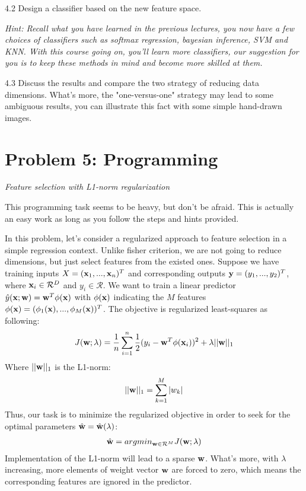 \documentclass{article}
\theoremstyle{definition}
\theoremstyle{definition}
\theoremstyle{remark}
\begin{document}
4.2 Design a classifier based on the new feature space.

\emph{Hint: Recall what you have learned in the previous lectures, you now have a few choices of classifiers such as softmax regression, bayesian inference, SVM and KNN. With this course going on, you'll learn more classifiers, our suggestion for you is to keep these methods in mind and become more skilled at them.}


4.3 Discuss the results and compare the two strategy of reducing data dimensions. What's more, the "one-versus-one" strategy may lead to some ambiguous results, you can illustrate this fact with some simple hand-drawn images.


\section*{Problem 5: Programming}
\emph{Feature selection with L1-norm regularization}

This programming task seems to be heavy, but don't be afraid. This is actually an easy work as long as you follow the steps and hints provided.

In this problem, let's consider a regularized approach to feature selection in a simple regression context. Unlike fisher criterion, we are not going to reduce dimensions, but just select features from the existed ones. Suppose we have training inputs $X=(\bold{x}_{1},...,\bold{x}_{n})^{T}$ and corresponding outputs $\bold{y}=(y_{1},...,y_{2})^{T}$, where $\bold{x}_{i}\in \mathcal{R}^{D}$ and $y_{i}\in \mathcal{R}$. We want to train a linear predictor $\hat{y}(\bold{x};\bold{w})=\bold{w}^{T}\phi(\bold{x})$ with $\phi(\bold{x})$ indicating the $M$ features $\phi(\bold{x})=(\phi_{1}(\bold{x}),...,\phi_{M}(\bold{x}))^{T}$. The objective is regularized least-squares as following:
\begin{eqnarray}
J(\bold{w};\lambda)=\frac{1}{n}\sum_{i=1}^{n}\frac{1}{2}(y_{i}-\bold{w}^{T}\phi(\bold{x}_{i}))^{2}+\lambda||\bold{w}||_{1}
\end{eqnarray}
Where $||\bold{w}||_{1}$ is the L1-norm:
\begin{eqnarray}
||\bold{w}||_{1}=\sum_{k=1}^{M}|w_{k}|
\end{eqnarray}
Thus, our task is to minimize the regularized objective in order to seek for the optimal parameters $\hat{\bold{w}}=\hat{\bold{w}}(\lambda)$:
\begin{eqnarray}
\hat{\bold{w}}=arg min_{\bold{w}\in\mathcal{R}^{M}}J(\bold{w};\lambda)
\end{eqnarray}
Implementation of the L1-norm will lead to a sparse $\bold{w}$. What's more, with $\lambda$ increasing, more elements of weight vector $\bold{w}$ are forced to zero, which means the corresponding features are ignored in the predictor.
\end{document}
